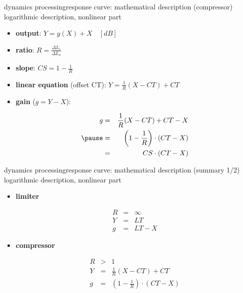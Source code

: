\begin{frame}{dynamics processing}{response curve: mathematical description (compressor)}
	\vspace{-5mm}
    logarithmic description, nonlinear part
    \bigskip
	\begin{itemize}
		\item	 \textbf{output}:
			$Y = g(X) + X\quad [\unit{dB}]$
		\pause
		\item	\textbf{ratio}:
			$R = \frac{\Delta L_i}{\Delta L_o}$
		\pause
		\item	\textbf{slope}:
			$CS = 1-\frac{1}{R}$
		\pause
		\item	\textbf{linear equation} (offset CT):
			$Y = \frac{1}{R}\left(X-CT\right) + CT$
		\pause
		\item	\textbf{gain} ($g = Y-X$):
			\begin{footnotesize}\begin{eqnarray*}
				g &=& \frac{1}{R}(X-CT) + CT - X\\
				\pause
				  &=& \left(1-\frac{1}{R}\right)\cdot (CT-X)\\
                  &=& CS\cdot(CT-X)
			\end{eqnarray*}\end{footnotesize}
	\end{itemize}
\end{frame}
\begin{frame}{dynamics processing}{response curve: mathematical description (summary 1/2)}
	\vspace{-5mm}
    logarithmic description, nonlinear part
    \bigskip
	\begin{itemize}
		\item	\textbf{limiter}
			\begin{footnotesize}\begin{eqnarray*}
				R &=& \infty\\
				Y &=& LT\\
				g &=& LT-X
			\end{eqnarray*}\end{footnotesize}
		\pause
		\item	\textbf{compressor}
			\begin{footnotesize}\begin{eqnarray*}
				R &>& 1\\
				Y &=& \frac{1}{R}\left(X-CT\right) + CT\\
				g &=& \left(1-\frac{1}{R}\right)\cdot (CT-X)
			\end{eqnarray*}\end{footnotesize}
	\end{itemize}
\end{frame}
